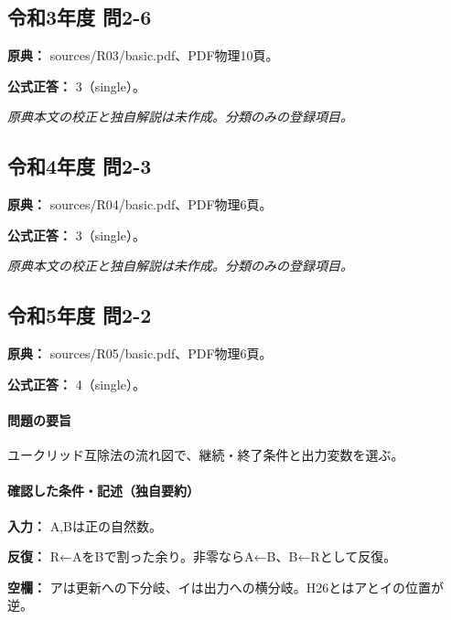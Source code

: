 \subsection{令和3年度 問2-6}
\label{q:r03-reg-basic-2-6}

\noindent\textbf{原典：} sources/R03/basic.pdf、PDF物理10頁。

\textbf{公式正答：} 3（single）。

\par\textit{原典本文の校正と独自解説は未作成。分類のみの登録項目。}

\subsection{令和4年度 問2-3}
\label{q:r04-reg-basic-2-3}

\noindent\textbf{原典：} sources/R04/basic.pdf、PDF物理6頁。

\textbf{公式正答：} 3（single）。

\par\textit{原典本文の校正と独自解説は未作成。分類のみの登録項目。}

\subsection{令和5年度 問2-2}
\label{q:r05-reg-basic-2-2}

\noindent\textbf{原典：} sources/R05/basic.pdf、PDF物理6頁。

\textbf{公式正答：} 4（single）。

\paragraph{問題の要旨} ユークリッド互除法の流れ図で、継続・終了条件と出力変数を選ぶ。

\paragraph{確認した条件・記述（独自要約）}\mbox{}\par

\noindent\textbf{入力：} A,Bは正の自然数。\par

\noindent\textbf{反復：} R←AをBで割った余り。非零ならA←B、B←Rとして反復。\par

\noindent\textbf{空欄：} アは更新への下分岐、イは出力への横分岐。H26とはアとイの位置が逆。\par

